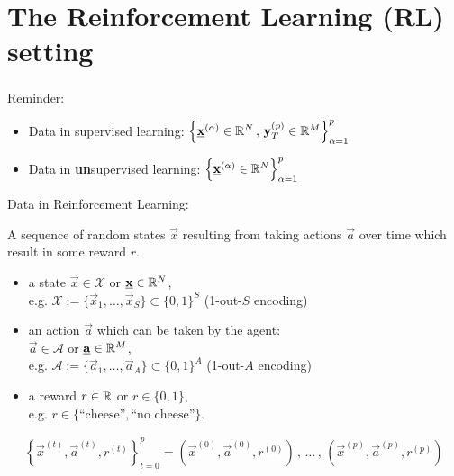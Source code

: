 \section{The Reinforcement Learning (RL) setting}



\begin{frame}\frametitle{\secname}

Reminder:
\begin{itemize}
\item Data in supervised learning:
$
\Big\{
	\underline{\mathbf{x}}^{(\alpha)} \in \mathbb{R}^N
	\,,\,
	\underline{\mathbf{y}}_T^{(p)} \in \mathbb{R}^M
\Big\}_{\alpha=1}^{p}
$

\item Data in \textbf{un}supervised learning:
$
\Big\{
	\underline{\mathbf{x}}^{(\alpha)} \in \mathbb{R}^N
\Big\}_{\alpha=1}^{p}
$\\

\end{itemize}

Data in Reinforcement Learning:

A sequence of random states $\vec x$ resulting from taking actions $\vec a$ over time which result in some reward $r$.

\pause

\begin{itemize}
\item a state $\vec x \in \mathcal{X}$ or $\underline{\mathbf{x}} \in \mathbb{R}^N$,\\
e.g. $\mathcal{X} := \{ \vec x_1, \ldots, \vec x_S\} \subset \{0,1\}^S$ (1-out-$S$ encoding)
\pause
\item an action $\vec a$ which can be taken by the agent:\\

$\vec a \in \mathcal{A}$ or $\underline{\mathbf{a}} \in \mathbb{R}^M$,\\
 e.g. $\mathcal{A} := \{ \vec a_1, \ldots, \vec a_A\} \subset \{0,1\}^A$ (1-out-$A$ encoding)
\pause
\item a reward $r \in \mathbb{R}$ or $r \in \{0,1\}$,\\
 e.g. $r \in \{\text{``cheese''},\text{``no cheese''}\}$.

\end{itemize}
\pause
{}

\begin{align}
\label{eq:chain}
\left\{\vec x^{(t)}, \vec a^{(t)}, r^{(t)}\right\}_{t=0}^{p} = 
\left( \vec x^{(0)}, \vec a^{(0)}, r^{(0)} \right) \,,\, \ldots \,,\, \left(\vec x^{(p)}, \vec a^{(p)}, r^{(p)} \right)
\end{align}


\end{frame}

